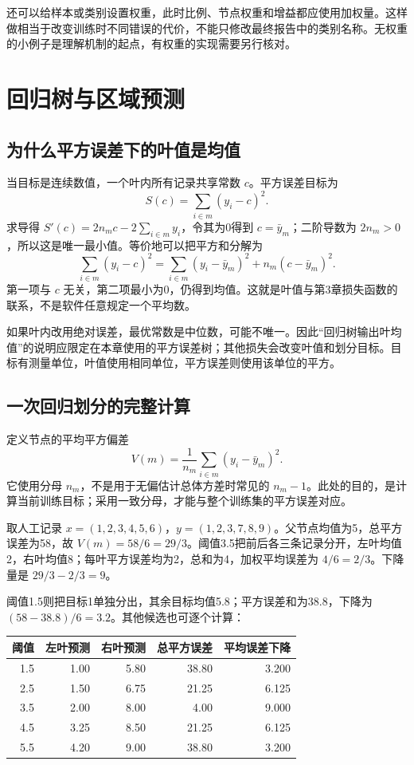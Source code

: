 还可以给样本或类别设置权重，此时比例、节点权重和增益都应使用加权量。这样做相当于改变训练时不同错误的代价，不能只修改最终报告中的类别名称。无权重的小例子是理解机制的起点，有权重的实现需要另行核对。

\section{回归树与区域预测}
\subsection{为什么平方误差下的叶值是均值}
当目标是连续数值，一个叶内所有记录共享常数 $c$。平方误差目标为
\[
S(c)=\sum_{i\in m}(y_i-c)^2.
\]
求导得 $S'(c)=2n_mc-2\sum_{i\in m}y_i$，令其为0得到 $c=\bar y_m$；二阶导数为 $2n_m>0$，所以这是唯一最小值。等价地可以把平方和分解为
\[
\sum_{i\in m}(y_i-c)^2=\sum_{i\in m}(y_i-\bar y_m)^2+n_m(c-\bar y_m)^2.
\]
第一项与 $c$ 无关，第二项最小为0，仍得到均值。这就是叶值与第3章损失函数的联系，不是软件任意规定一个平均数。

如果叶内改用绝对误差，最优常数是中位数，可能不唯一。因此“回归树输出叶均值”的说明应限定在本章使用的平方误差树；其他损失会改变叶值和划分目标。目标有测量单位，叶值使用相同单位，平方误差则使用该单位的平方。

\subsection{一次回归划分的完整计算}
定义节点的平均平方偏差
\[
V(m)=\frac1{n_m}\sum_{i\in m}(y_i-\bar y_m)^2.
\]
它使用分母 $n_m$，不是用于无偏估计总体方差时常见的 $n_m-1$。此处的目的，是计算当前训练目标；采用一致分母，才能与整个训练集的平方误差对应。

取人工记录 $x=(1,2,3,4,5,6)$，$y=(1,2,3,7,8,9)$。父节点均值为5，总平方误差为58，故 $V(m)=58/6=29/3$。阈值3.5把前后各三条记录分开，左叶均值2，右叶均值8；每叶平方误差均为2，总和为4，加权平均误差为 $4/6=2/3$。下降量是 $29/3-2/3=9$。

阈值1.5则把目标1单独分出，其余目标均值5.8；平方误差和为38.8，下降为 $(58-38.8)/6=3.2$。其他候选也可逐个计算：
\begin{center}\small
\begin{tabular}{rrrrr}\toprule
阈值&左叶预测&右叶预测&总平方误差&平均误差下降\\\midrule
1.5&1.00&5.80&38.80&3.200\\
2.5&1.50&6.75&21.25&6.125\\
3.5&2.00&8.00&4.00&9.000\\
4.5&3.25&8.50&21.25&6.125\\
5.5&4.20&9.00&38.80&3.200\\\bottomrule
\end{tabular}\end{center}

